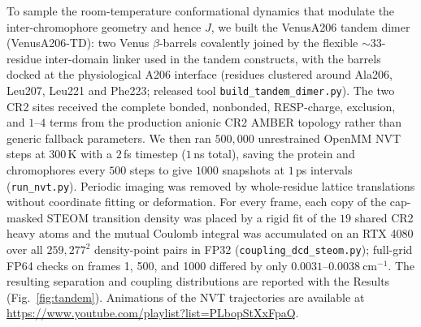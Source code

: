 \documentclass[journal=jpcbfk, manuscript=article, layout=twocolumn, doi=true]{achemso}
\begin{document}
{To sample the room-temperature conformational dynamics that modulate the inter-chromophore geometry and hence $J$, we built the VenusA206 tandem dimer (VenusA206-TD): two Venus $\beta$-barrels covalently joined by the flexible ${\sim}33$-residue inter-domain linker used in the tandem constructs, with the barrels docked at the physiological A206 interface (residues clustered around Ala206, Leu207, Leu221 and Phe223; released tool \texttt{build\_\allowbreak tandem\_\allowbreak dimer.py}). The two CR2 sites received the complete bonded, nonbonded, RESP-charge, exclusion, and $1$--$4$ terms from the production anionic CR2 AMBER topology rather than generic fallback parameters. We then ran $500{,}000$ unrestrained OpenMM NVT steps at $300$\,K with a $2$\,fs timestep ($1$\,ns total), saving the protein and chromophores every $500$ steps to give $1000$ snapshots at $1$\,ps intervals (\texttt{run\_nvt.py}). Periodic imaging was removed by whole-residue lattice translations without coordinate fitting or deformation. For every frame, each copy of the cap-masked STEOM transition density was placed by a rigid fit of the $19$ shared CR2 heavy atoms and the mutual Coulomb integral was accumulated on an RTX 4080 over all $259{,}277^2$ density-point pairs in FP32 (\texttt{coupling\_dcd\_steom.py}); full-grid FP64 checks on frames 1, 500, and 1000 differed by only $0.0031$--$0.0038~\mathrm{cm^{-1}}$. The resulting separation and coupling distributions are reported with the Results (Fig.~\ref{fig:tandem}). Animations of the NVT trajectories are available at \url{https://www.youtube.com/playlist?list=PLbopStXxFpaQ}.}
\end{document}
